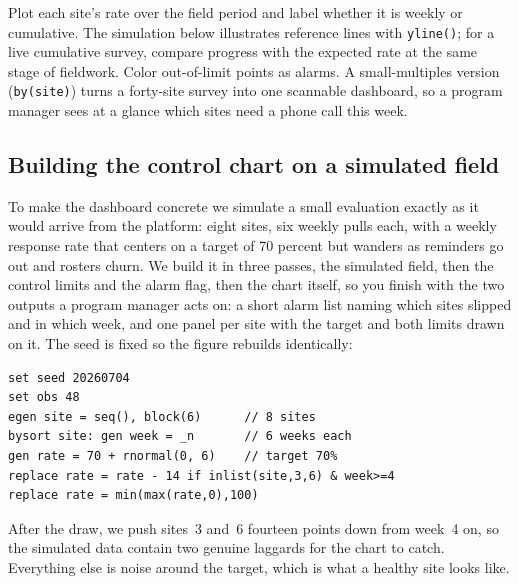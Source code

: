 \documentclass[
    a4paper,
    fontsize=10pt,
    twoside=true,
    numbers=noenddot,
]{kaobook}
\newenvironment{vizcallout}[1][Visualization to build]{%
    \begin{vizbox}[frametitle={#1}]%
}{%
    \end{vizbox}%
}
\begin{document}
\begin{vizcallout}[Visualization to build: the response-rate control chart]
Plot each site's rate over the field period and label whether it is weekly or cumulative. The simulation below illustrates reference lines with \texttt{yline()}; for a live cumulative survey, compare progress with the expected rate at the same stage of fieldwork. Color out-of-limit points as alarms. A small-multiples version (\texttt{by(site)}) turns a forty-site survey into one scannable dashboard, so a program manager sees at a glance which sites need a phone call this week.
\end{vizcallout}

\subsection{Building the control chart on a simulated field}\label{sec:monitor-build}
To make the dashboard concrete we simulate a small evaluation exactly as it would arrive from the platform: eight sites, six weekly pulls each, with a weekly response rate that centers on a target of 70 percent but wanders as reminders go out and rosters churn. We build it in three passes, the simulated field, then the control limits and the alarm flag, then the chart itself, so you finish with the two outputs a program manager acts on: a short alarm list naming which sites slipped and in which week, and one panel per site with the target and both limits drawn on it. The seed is fixed so the figure rebuilds identically:
\par
{\footnotesize
\begin{verbatim}
set seed 20260704
set obs 48
egen site = seq(), block(6)      // 8 sites
bysort site: gen week = _n       // 6 weeks each
gen rate = 70 + rnormal(0, 6)    // target 70%
replace rate = rate - 14 if inlist(site,3,6) & week>=4
replace rate = min(max(rate,0),100)
\end{verbatim}
}
After the draw, we push sites~3 and~6 fourteen points down from week~4 on, so the simulated data contain two genuine laggards for the chart to catch. Everything else is noise around the target, which is what a healthy site looks like.
\end{document}
